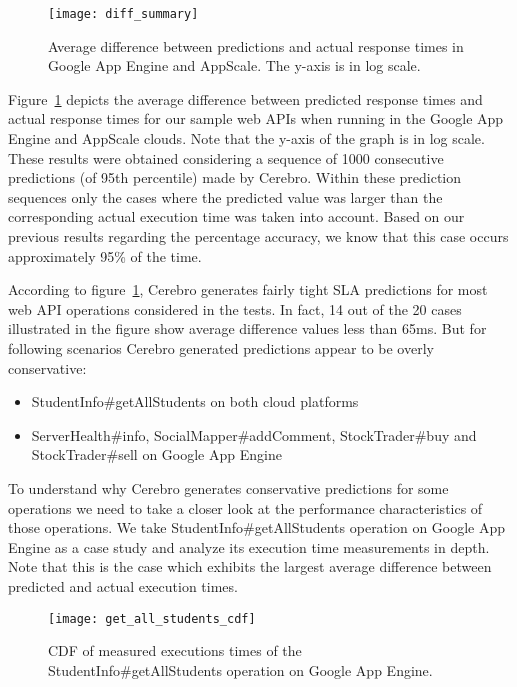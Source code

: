 \begin{figure}
\centering
\texttt{[image: diff\_summary]}
\caption{Average difference between predictions and actual response times in Google App Engine and AppScale. The y-axis is in log scale.}
\label{fig:diff_summary}
\end{figure}

Figure~\ref{fig:diff_summary} depicts the average difference between predicted response times and actual response times for
our sample web APIs when running in the Google App Engine and AppScale clouds. Note that the y-axis of the graph is
in log scale. These results were obtained considering a sequence of 1000 consecutive predictions (of 95th percentile) made by Cerebro. 
Within these prediction sequences only the cases 
where the predicted value was larger than the corresponding actual execution time was taken into account. Based on our previous results
regarding the percentage accuracy, we know that this case occurs approximately 95\% of the time.

According to figure~\ref{fig:diff_summary}, Cerebro generates fairly tight SLA predictions for most web API operations considered in the tests. In fact,
14 out of the 20 cases illustrated in the figure show average difference values less than 65ms. But for following scenarios Cerebro generated
predictions appear to be overly conservative:

\begin{itemize}
\item StudentInfo\#getAllStudents on both cloud platforms
\item ServerHealth\#info, SocialMapper\#addComment, StockTrader\#buy and StockTrader\#sell on Google App Engine
\end{itemize}

To understand why Cerebro generates conservative predictions for some operations we need to 
take a closer look at the performance characteristics of those operations. We take StudentInfo\#getAllStudents
operation on Google App Engine as a case study and analyze its execution time measurements in depth. 
Note that this is the case which exhibits the largest average difference between predicted and actual execution times.

\begin{figure}
\centering
\texttt{[image: get\_all\_students\_cdf]}
\caption{CDF of measured executions times of the StudentInfo\#getAllStudents operation on Google App Engine.}
\label{fig:get_all_students_cdf}
\end{figure}

